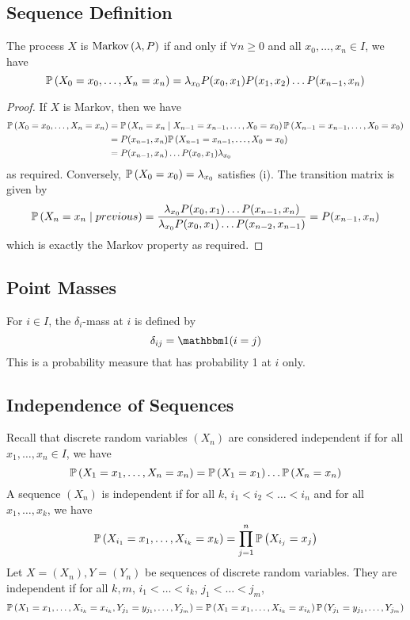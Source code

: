 \subsection{Sequence Definition}
\begin{theorem}
	The process \( X \) is \( \operatorname{Markov}\left({\lambda, P}\right) \) if and only if \( \forall n \geq 0 \) and all \( x_0, \dots, x_n \in I \), we have
	\[
		\mathbb{P}\left({X_0 = x_0, \dots, X_n = x_n}\right) = \lambda_{x_0} P(x_0, x_1) P(x_1, x_2) \dots P(x_{n-1}, x_n)
	\]
\end{theorem}
\begin{proof}
	If \( X \) is Markov, then we have
	\begin{align*}
		\mathbb{P}\left({X_0 = x_0, \dots, X_n = x_n}\right) & = \mathbb{P}\left({X_n = x_n \mid X_{n-1} = x_{n-1}, \dots, X_0 = x_0}\right) \mathbb{P}\left({X_{n-1} = x_{n-1}, \dots, X_0 = x_0}\right) \\
		                                   & = P(x_{n-1}, x_n) \mathbb{P}\left({X_{n-1} = x_{n-1}, \dots, X_0 = x_0}\right)                                           \\
		                                   & = P(x_{n-1}, x_n) \dots P(x_0, x_1) \lambda_{x_0}
	\end{align*}
	as required.
	Conversely, \( \mathbb{P}\left({X_0 = x_0}\right) = \lambda_{x_0} \) satisfies (i).
	The transition matrix is given by
	\[
		\mathbb{P}\left({X_n = x_n \mid previous}\right) = \frac{\lambda_{x_0} P(x_0, x_1) \dots P(x_{n-1}, x_n)}{\lambda_{x_0} P(x_0, x_1) \dots P(x_{n-2}, x_{n-1})} = P(x_{n-1}, x_n)
	\]
	which is exactly the Markov property as required.
\end{proof}

\subsection{Point Masses}
\begin{definition}
	For \( i \in I \), the \( \delta_i \)-mass at \( i \) is defined by
	\[
		\delta_{ij} = \mathbbm 1 (i = j)
	\]
	This is a probability measure that has probability 1 at \( i \) only.
\end{definition}

\subsection{Independence of Sequences}
Recall that discrete random variables \( (X_n) \) are considered independent if for all \( x_1, \dots, x_n \in I \), we have
\[
	\mathbb{P}\left({X_1 = x_1, \dots, X_n = x_n}\right) = \mathbb{P}\left({X_1 = x_1}\right)\dots\mathbb{P}\left({X_n = x_n}\right)
\]
A sequence \( (X_n) \) is independent if for all \( k \), \( i_1 < i_2 < \dots < i_n \) and for all \( x_1, \dots, x_k \), we have
\[
	\mathbb{P}\left({X_{i_1} = x_1, \dots, X_{i_k} = x_k}\right) = \prod_{j=1}^n \mathbb{P}\left({X_{i_j} = x_j}\right)
\]
Let \( X = (X_n), Y = (Y_n) \) be sequences of discrete random variables.
They are independent if for all \(k,m\), \( i_1 < \dots < i_k \), \( j_1 < \dots < j_m \),
\[
	\mathbb{P}\left({X_1 = x_1, \dots, X_{i_k} = x_{i_k}, Y_{j_1} = y_{j_1}, \dots, Y_{j_m}}\right) = \mathbb{P}\left({X_1 = x_1, \dots, X_{i_k} = x_{i_k}}\right) \mathbb{P}\left({Y_{j_1} = y_{j_1}, \dots, Y_{j_m}}\right)
\]
